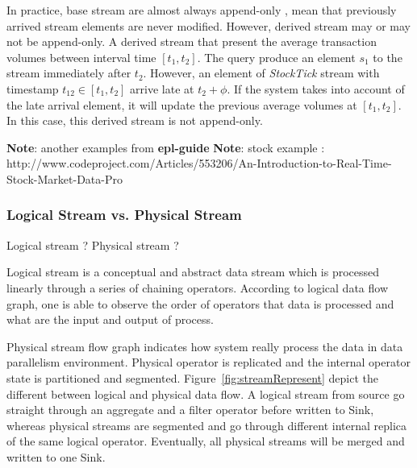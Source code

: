 In practice, base stream are almost always append-only , mean that previously arrived stream elements are never modified. However, derived stream may or may not be append-only\cite{Golab:2010}. A derived stream that present the average transaction volumes between interval time $[t_1, t_2]$. The query produce an element $s_1$ to the stream immediately after $t_2$. However, an element of \textit{StockTick} stream with timestamp 
$t_{12} \in [t_1,t_2]$ arrive late at $t_2+\phi$. If the system takes into account of the late arrival element, it will update the previous average volumes at $[t_1, t_2]$. In this case, this derived stream is not append-only.


\textbf{Note}: another examples from \textbf{epl-guide}
\textbf{Note}: stock example : http://www.codeproject.com/Articles/553206/An-Introduction-to-Real-Time-Stock-Market-Data-Pro


\subsubsection*{Logical Stream vs. Physical Stream}
Logical stream ?  \citep{Kramer:2009}Physical stream ?  \citep{Kramer:2009}

Logical stream is a conceptual and abstract data stream which is processed linearly through a series of chaining operators. According to logical data flow graph, one is able to observe the order of operators that data is processed and what are the input and output of process.

Physical stream flow graph indicates how system really process the data in data parallelism environment. Physical operator is replicated and the internal operator state is partitioned and segmented. Figure~\ref{fig:streamRepresent} depict the different between logical and physical data flow.
A logical stream from source go straight through an aggregate and a filter operator before written to Sink, whereas physical streams are segmented and go through different internal replica of the same logical operator. Eventually, all physical streams will be merged and written to one Sink. 


